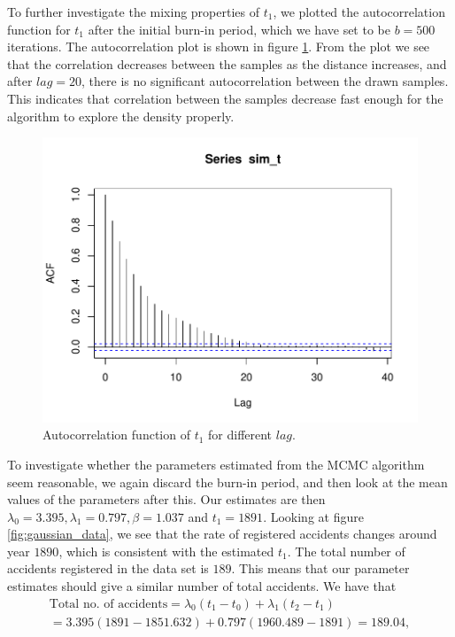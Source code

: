 To further investigate the mixing properties of $t_1$, we plotted the autocorrelation function for $t_1$ after the initial burn-in period, which we have set to be $b = 500$ iterations. The autocorrelation plot is shown in figure \ref{fig:acf_t}. From the plot we see that the correlation decreases between the samples as the distance increases, and after $lag = 20$, there is no significant autocorrelation between the drawn samples. This indicates that correlation between the samples decrease fast enough for the algorithm to explore the density properly. 

\begin{figure}[H]
    \centering
    \includegraphics[width = \textwidth]{Images/acf_t_10000.pdf}
    \caption{Autocorrelation function of $t_1$ for different $lag$. }
    \label{fig:acf_t}
\end{figure}


To investigate whether the parameters estimated from the MCMC algorithm seem reasonable, we again discard the burn-in period, and then look at the mean values of the parameters after this. Our estimates are then $\lambda_0 = 3.395, \lambda_1 = 0.797 , \beta = 1.037 $ and $t_1 = 1891$. Looking at figure \ref{fig:gaussian_data}, we see that the rate of registered accidents changes around year $1890$, which is consistent with the estimated $t_1$. The total number of accidents registered in the data set is $189$. This means that our parameter estimates should give a similar number of total accidents. We have that
\begin{align}
    \text{Total no. of accidents} = \lambda_0(t_1 - t_0) + \lambda_1(t_2 - t_1) \nonumber \\
    = 3.395(1891-1851.632) + 0.797(1960.489 - 1891) = 189.04, 
\end{align}

